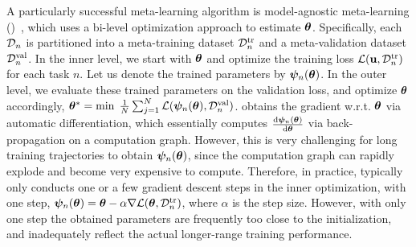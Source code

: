 A particularly successful meta-learning algorithm is model-agnostic meta-learning (\maml)~\citep{finn2017model}, which uses a bi-level optimization approach to estimate $\boldsymbol{\theta}$. Specifically, each  $\mathcal{D}_n$ is partitioned into a meta-training dataset $\mathcal{D}_n^{\text{tr}}$ and a meta-validation dataset $\mathcal{D}_n^{\text{val}}$. In the inner level, we start with $\boldsymbol{\theta}$ and optimize the training loss $\mathcal{L}({\bf u}, \mathcal{D}_n^{\text{tr}})$ for each task $n$. Let us denote the trained parameters by $\boldsymbol{\psi}_n(\boldsymbol{\theta})$. In the outer level, we evaluate these trained parameters on the validation loss, and optimize $\boldsymbol{\theta}$ accordingly, \ie $\boldsymbol{\theta}^* = \min\; \frac{1}{N} \sum\nolimits_{j=1}^N \mathcal{L}(\boldsymbol{\psi}_n(\boldsymbol{\theta}), \mathcal{D}_n^{\text{val}})$. 
\maml obtains the gradient w.r.t. $\boldsymbol{\theta}$ via automatic differentiation, which essentially computes $\frac{{\rm d} \boldsymbol{\psi}_n(\boldsymbol{\theta})}{{\rm d} \boldsymbol{\theta}}$ via back-propagation on a computation graph. However, this is very challenging for long training trajectories to obtain $\boldsymbol{\psi}_n(\boldsymbol{\theta})$, since the computation graph can rapidly explode and become very expensive to compute. Therefore, in practice, \maml typically only conducts one or a few gradient descent steps in the inner optimization, \eg with one step, $\boldsymbol{\psi}_n(\boldsymbol{\theta}) = \boldsymbol{\theta} - \alpha \nabla \mathcal{L}(\boldsymbol{\theta}, \mathcal{D}_n^{\text{tr}})$, %
where $\alpha$ is the step size. However, with only one step the obtained parameters are frequently too close to the initialization, and inadequately reflect the actual longer-range training performance.%

